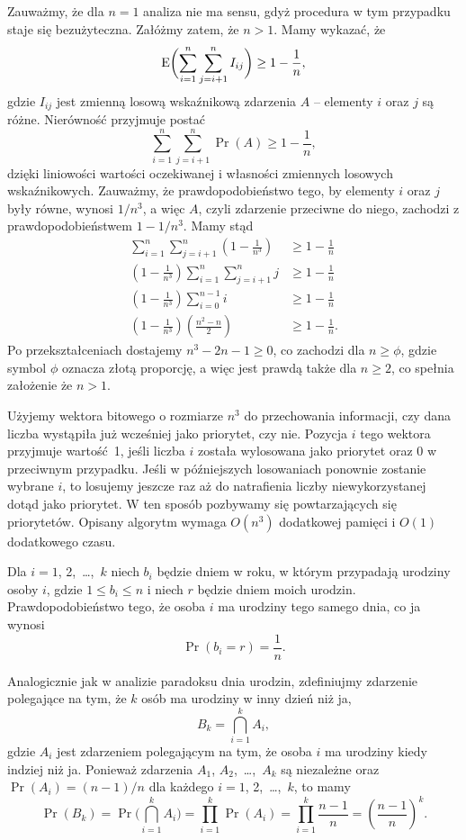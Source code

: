 \exercise %
Zauważmy, że dla $n=1$ analiza nie ma sensu, gdyż procedura  w tym przypadku staje się bezużyteczna. Załóżmy zatem, że $n>1$. Mamy wykazać, że
\[
	\operatorname{E}\biggl(\sum_{i=1}^n\sum_{j=i+1}^nI_{ij}\biggr) \ge 1-\frac{1}{n},
\]
gdzie $I_{ij}$ jest zmienną losową wskaźnikową zdarzenia $A$ -- elementy $i$ oraz $j$ są różne. Nierówność przyjmuje postać
\[
	\sum_{i=1}^n\sum_{j=i+1}^n\Pr(A) \ge 1-\frac{1}{n},
\]
dzięki liniowości wartości oczekiwanej i własności zmiennych losowych wskaźnikowych. Zauważmy, że prawdopodobieństwo tego, by elementy $i$ oraz $j$ były równe, wynosi $1/n^3$, a więc $A$, czyli zdarzenie przeciwne do niego, zachodzi z prawdopodobieństwem $1-1/n^3$. Mamy stąd
\begin{align*}
	\sum_{i=1}^n\sum_{j=i+1}^n\left(1-\frac{1}{n^3}\right) &\ge 1-\frac{1}{n} \\
	\left(1-\frac{1}{n^3}\right)\sum_{i=1}^n\sum_{j=i+1}^nj &\ge 1-\frac{1}{n} \\
	\left(1-\frac{1}{n^3}\right)\sum_{i=0}^{n-1}i &\ge 1-\frac{1}{n} \\
	\left(1-\frac{1}{n^3}\right)\left(\frac{n^2-n}{2}\right) &\ge 1-\frac{1}{n}.
\end{align*}
Po przekształceniach dostajemy $n^3-2n-1\ge0$, co zachodzi dla $n\ge\phi$, gdzie symbol $\phi$ oznacza złotą proporcję, a więc jest prawdą także dla $n\ge2$, co spełnia założenie że $n>1$.

\exercise %
Użyjemy wektora bitowego o rozmiarze $n^3$ do przechowania informacji, czy dana liczba wystąpiła już wcześniej jako priorytet, czy nie. Pozycja $i$ tego wektora przyjmuje wartość~1, jeśli liczba $i$ została wylosowana jako priorytet oraz 0 w przeciwnym przypadku. Jeśli w późniejszych losowaniach ponownie zostanie wybrane $i$, to losujemy jeszcze raz aż do natrafienia liczby niewykorzystanej dotąd jako priorytet. W ten sposób pozbywamy się powtarzających się priorytetów. Opisany algorytm wymaga $O(n^3)$ dodatkowej pamięci i $O(1)$ dodatkowego czasu.


\exercise %
Dla $i=1$, 2,~\dots,~$k$ niech $b_i$ będzie dniem w roku, w którym przypadają urodziny osoby $i$, gdzie $1\le b_i\le n$ i niech $r$ będzie dniem moich urodzin. Prawdopodobieństwo tego, że osoba $i$ ma urodziny tego samego dnia, co ja wynosi
\[
	\Pr(b_i=r) = \frac{1}{n}.
\]

Analogicznie jak w analizie paradoksu dnia urodzin, zdefiniujmy zdarzenie polegające na tym, że $k$ osób ma urodziny w inny dzień niż ja,
\[
	B_k = \bigcap_{i=1}^kA_i,
\]
gdzie $A_i$ jest zdarzeniem polegającym na tym, że osoba $i$ ma urodziny kiedy indziej niż ja. Ponieważ zdarzenia $A_1$, $A_2$,~\dots,~$A_k$ są niezależne oraz $\Pr(A_i)=(n-1)/n$ dla każdego $i=1$, 2,~\dots,~$k$, to mamy
\[
	\Pr(B_k) = \Pr\biggl(\bigcap_{i=1}^kA_i\biggr) = \prod_{i=1}^k\Pr(A_i) = \prod_{i=1}^k\frac{n-1}{n} = \left(\frac{n-1}{n}\right)^k.
\]

